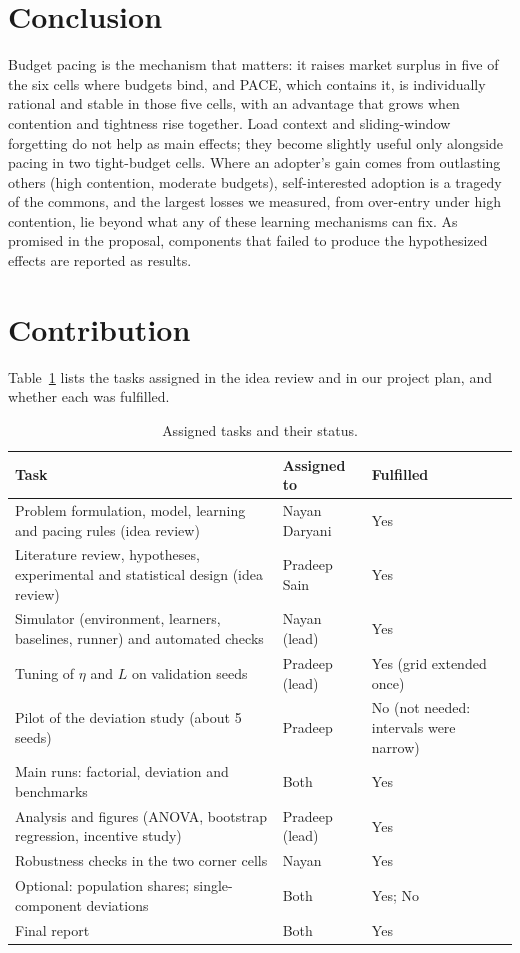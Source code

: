 \documentclass{article}
\begin{document}
\section*{Conclusion}
Budget pacing is the mechanism that matters: it raises market surplus in five of the six cells where budgets bind, and PACE, which contains it, is individually rational and stable in those five cells, with an advantage that grows when contention and tightness rise together. Load context and sliding-window forgetting do not help as main effects; they become slightly useful only alongside pacing in two tight-budget cells. Where an adopter's gain comes from outlasting others (high contention, moderate budgets), self-interested adoption is a tragedy of the commons, and the largest losses we measured, from over-entry under high contention, lie beyond what any of these learning mechanisms can fix. As promised in the proposal, components that failed to produce the hypothesized effects are reported as results.

\section{Contribution}
\label{sec:contrib}
Table~\ref{tab:contrib} lists the tasks assigned in the idea review and in our project plan, and whether each was fulfilled.

\begin{table}[H]
\centering\small
\caption{Assigned tasks and their status.}
\label{tab:contrib}
\begin{tabular}{@{}p{8.7cm} l l@{}}
\toprule
\textbf{Task} & \textbf{Assigned to} & \textbf{Fulfilled}\\
\midrule
Problem formulation, model, learning and pacing rules (idea review) & Nayan Daryani & Yes\\
Literature review, hypotheses, experimental and statistical design (idea review) & Pradeep Sain & Yes\\
Simulator (environment, learners, baselines, runner) and automated checks & Nayan (lead) & Yes\\
Tuning of $\eta$ and $L$ on validation seeds & Pradeep (lead) & Yes (grid extended once)\\
Pilot of the deviation study (about 5 seeds) & Pradeep & No (not needed: intervals were narrow)\\
Main runs: factorial, deviation and benchmarks & Both & Yes\\
Analysis and figures (ANOVA, bootstrap regression, incentive study) & Pradeep (lead) & Yes\\
Robustness checks in the two corner cells & Nayan & Yes\\
Optional: population shares; single-component deviations & Both & Yes; No\\
Final report & Both & Yes\\
\bottomrule
\end{tabular}
\end{table}
\end{document}

